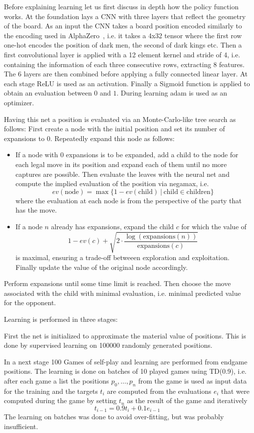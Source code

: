 \documentclass[a4paper,12pt]{article}
\theoremstyle{definition}
\theoremstyle{definition}
\theoremstyle{definition}
\theoremstyle{definition}
\theoremstyle{definition}
\theoremstyle{definition}
\begin{document}
	Before explaining learning let us first discuss in depth how the policy function works. At the foundation lays a CNN with three layers that reflect the geometry of the board. As an input the CNN takes a board position encoded similarly to the encoding used in AlphaZero~\cite{silver2017mastering}, i.e. it takes a 4x32 tensor where the first row one-hot encodes the position of dark men, the second of dark kings etc. Then a first convolutional layer is applied with a 12 element kernel and stride of 4, i.e. containing the information of each three consecutive rows, extracting 8 features. The 6 layers are then combined before applying a fully connected linear layer. At each stage ReLU is used as an activation. Finally a Sigmoid function is applied to obtain an evaluation between $0$ and $1$. During learning adam is used as an optimizer.
	
	Having this net a position is evaluated via an Monte-Carlo-like tree search as follows: First create a node with the initial position and set its number of expansions to 0. Repeatedly expand this node as follows:
	\begin{itemize}
		\item If a node with $0$ expansions is to be expanded, add a child to the node for each legal move in its position and expand each of them until no more captures are possible. Then evaluate the leaves with the neural net and compute the implied evaluation of the position via negamax, i.e. 
		$$ev(\text{node}) = \max\{1 - ev(\text{child})\:|\:\text{child}\in\text{children}\}$$
		where the evaluation at each node is from the perspective of the party that has the move.
		\item If a node $n$ already has expansions, expand the child $c$ for which the value of
		$$1-ev(c) + \sqrt{2\cdot\frac{\log(\text{expansions}(n))}{\text{expansions}(c)}}$$
		is maximal, ensuring a trade-off betweeen exploration and exploitation. Finally update the value of the original node accordingly.
	\end{itemize}
	Perform expansions until some time limit is reached. Then choose the move associated with the child with minimal evaluation, i.e. minimal predicted value for the opponent.
	
	Learning is performed in three stages:
	
	First the net is initialized to approximate the material value of positions. This is done by supervised learning on 100000 randomly generated positions.
	
	In a next stage 100 Games of self-play and learning are performed from endgame positions. The learning is done on batches of 10 played games using TD(0.9), i.e. after each game a list the positions $p_0,\dots, p_n$ from the game is used as input data for the training and the targets $t_i$ are computed from the evaluations $e_i$ that were computed during the game by setting $t_n$ as the result of the game and iteratively $$t_{i-1} = 0.9t_i + 0.1e_{i-1}$$
	The learning on batches was done to avoid over-fitting, but was probably insufficient.
	
\end{document}
